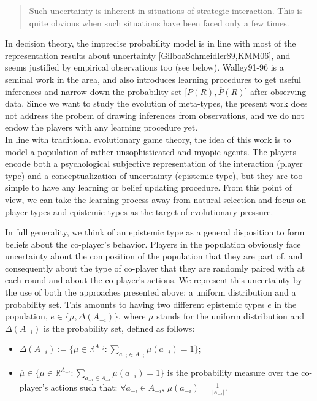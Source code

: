 \documentclass[fleqn,reqno,11pt]{article}
\begin{document}
\begin{quote}
Such uncertainty is inherent in situations of strategic interaction. This is quite obvious when such situations have been faced only a few times.
\end{quote}
In decision theory, the imprecise probability model is in line with most of the representation results about uncertainty [GilboaSchmeidler89,KMM06], and seems justified by empirical observations too (see below). Walley91-96 is a seminal work in the area, and also introduces learning procedures to get useful inferences and narrow down the probability set [$\underline{P}(R), \overline{P}(R)$] after observing data. Since we want to study the evolution of meta-types, the present work does not address the probem of drawing inferences from observations, and we do not endow the players with any learning procedure yet.\\
In line with traditional evolutionary game theory, the idea of this work is to model a population of rather unsophisticated and myopic agents. %
The players encode both a psychological subjective representation of the interaction (player type) and a conceptualization of uncertainty (epistemic type), but they are too simple to have any learning or belief updating procedure. From this point of view, we can take the learning process away from natural selection and focus on player types and epistemic types as the target of evolutionary pressure.

In full generality, we think of an epistemic type as a general disposition to form beliefs about the co-player’s behavior.    Players in the population obviously face uncertainty about the composition of the population that they are part of, and consequently about the type of co-player that they are randomly paired with at each round and about the co-player's actions. We represent this uncertainty by the use of both the approaches presented above: a uniform distribution and a probability set. This amounts to having two different epistemic types $e$ in the population, $e \in \lbrace \overline{\mu}, \Delta(A_{-i}) \rbrace $, where $\overline{\mu}$ stands for the uniform distribution and $\Delta(A_{-i})$ is the probability set, defined as follows:

\begin{itemize}

\item $ \Delta(A_{-i}):=\lbrace \mu \in \mathbb{R}^{A_{-i}}: \sum_{a_{-i} \in A_{-i}} \mu(a_{-i}) = 1 \rbrace$;

\item $\overline{\mu} \in \lbrace \mu \in \mathbb{R}^{A_{-i}}: \sum_{a_{-i} \in A_{-i}} \mu(a_{-i}) = 1 \rbrace$ is the probability measure over the co-player's actions such that: $\forall a_{-i} \in A_{-i}$, $\overline{\mu}(a_{-i})= \frac{1}{|A_{-i}|}$.

\end{itemize} 
\end{document}
